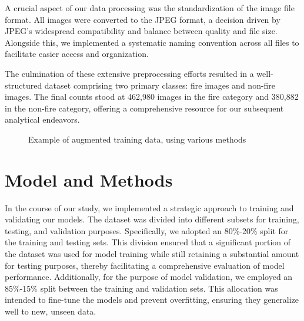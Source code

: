 A crucial aspect of our data processing was the standardization of the image file format. All images were converted to the JPEG format, a decision driven by JPEG's widespread compatibility and balance between quality and file size. Alongside this, we implemented a systematic naming convention across all files to facilitate easier access and organization.

The culmination of these extensive preprocessing efforts resulted in a well-structured dataset comprising two primary classes: fire images and non-fire images. The final counts stood at 462,980 images in the fire category and 380,882 in the non-fire category, offering a comprehensive resource for our subsequent analytical endeavors.


\begin{figure}%
	\centering
	\qquad
	\qquad

	\qquad
	\qquad
	\caption{
		Example of augmented training data, using various methods
	}%
	\label{preprocessing}
\end{figure}

\section{Model and Methods}

In the course of our study, we implemented a strategic approach to training and validating our models. The dataset was divided into different subsets for training, testing, and validation purposes. Specifically, we adopted an 80\%-20\% split for the training and testing sets. This division ensured that a significant portion of the dataset was used for model training while still retaining a substantial amount for testing purposes, thereby facilitating a comprehensive evaluation of model performance. Additionally, for the purpose of model validation, we employed an 85\%-15\% split between the training and validation sets. This allocation was intended to fine-tune the models and prevent overfitting, ensuring they generalize well to new, unseen data.

